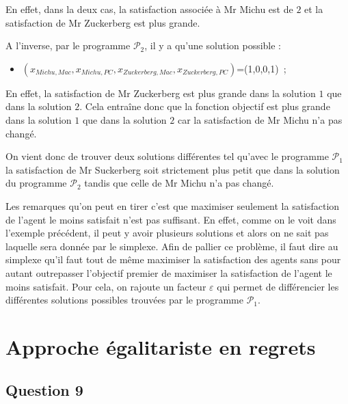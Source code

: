 \documentclass[a4paper, titlepage, oneside, 12pt]{article}%
\begin{document}
En effet, dans la deux cas, la satisfaction associée à Mr Michu est de $2$ et la satisfaction de Mr Zuckerberg est plus  grande.

A l'inverse, par le programme $\mathcal{P}_2$, il y a qu'une solution possible :
\begin{itemize}
\item $(x_{Michu, Mac},x_{Michu, PC},x_{Zuckerberg, Mac},x_{Zuckerberg, PC})$=(1,0,0,1)~;
\end{itemize}

En effet, la satisfaction de Mr Zuckerberg est plus grande dans la solution $1$ que dans la solution $2$. Cela entraîne donc que la fonction objectif est plus grande dans la solution $1$ que dans la solution $2$ car la satisfaction de Mr Michu n'a pas changé.

On vient donc de trouver deux solutions différentes tel qu'avec le programme $\mathcal{P}_1$ la satisfaction de Mr Suckerberg soit strictement plus petit que dans la solution du programme $\mathcal{P}_2$ tandis que celle de Mr Michu n'a pas changé.

Les remarques qu'on peut en tirer c'est que maximiser seulement la satisfaction de l'agent le moins satisfait n'est pas suffisant. En effet, comme on le voit dans l'exemple précédent, il peut y avoir plusieurs solutions et alors on ne sait pas laquelle sera donnée par le simplexe. Afin de pallier ce problème, il faut dire au simplexe qu'il faut tout de même maximiser la satisfaction des agents sans pour autant outrepasser l'objectif premier de maximiser la satisfaction de l'agent le moins satisfait. Pour cela, on rajoute un facteur $\varepsilon$ qui permet de différencier les différentes solutions possibles trouvées par le programme $\mathcal{P}_1$.



\section{Approche égalitariste en regrets}

\subsection{Question 9}
\end{document}
